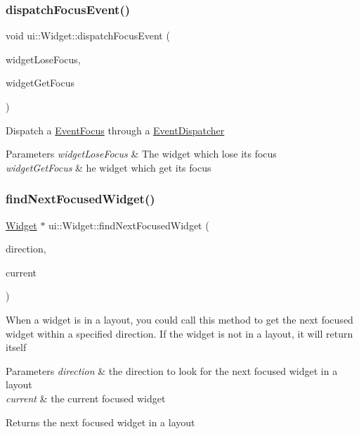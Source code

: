 \subsubsection{\texorpdfstring{dispatch\+Focus\+Event()}{dispatchFocusEvent()}\hspace{0.1cm}{\footnotesize\ttfamily [2/2]}}
{\footnotesize\ttfamily void ui\+::\+Widget\+::dispatch\+Focus\+Event (\begin{DoxyParamCaption}\item[{\hyperlink{classui_1_1Widget}{Widget} $\ast$}]{widget\+Lose\+Focus,  }\item[{\hyperlink{classui_1_1Widget}{Widget} $\ast$}]{widget\+Get\+Focus }\end{DoxyParamCaption})}

Dispatch a \hyperlink{classEventFocus}{Event\+Focus} through a \hyperlink{classEventDispatcher}{Event\+Dispatcher} 
\begin{DoxyParams}{Parameters}
{\em widget\+Lose\+Focus} & The widget which lose its focus \\
\hline
{\em widget\+Get\+Focus} & he widget which get its focus \\
\hline
\end{DoxyParams}
\mbox{\label{classui_1_1Widget_a40a7ca0d546f39536dadf60722b947d0}} 
\subsubsection{\texorpdfstring{find\+Next\+Focused\+Widget()}{findNextFocusedWidget()}\hspace{0.1cm}{\footnotesize\ttfamily [1/2]}}
{\footnotesize\ttfamily \hyperlink{classui_1_1Widget}{Widget} $\ast$ ui\+::\+Widget\+::find\+Next\+Focused\+Widget (\begin{DoxyParamCaption}\item[{\hyperlink{classui_1_1Widget_a8ae8e8fc793a04a87584205cd1e8a8a5}{Focus\+Direction}}]{direction,  }\item[{\hyperlink{classui_1_1Widget}{Widget} $\ast$}]{current }\end{DoxyParamCaption})\hspace{0.3cm}{\ttfamily [virtual]}}

When a widget is in a layout, you could call this method to get the next focused widget within a specified direction. If the widget is not in a layout, it will return itself 
\begin{DoxyParams}{Parameters}
{\em direction} & the direction to look for the next focused widget in a layout \\
\hline
{\em current} & the current focused widget \\
\hline
\end{DoxyParams}
\begin{DoxyReturn}{Returns}
the next focused widget in a layout 
\end{DoxyReturn}


